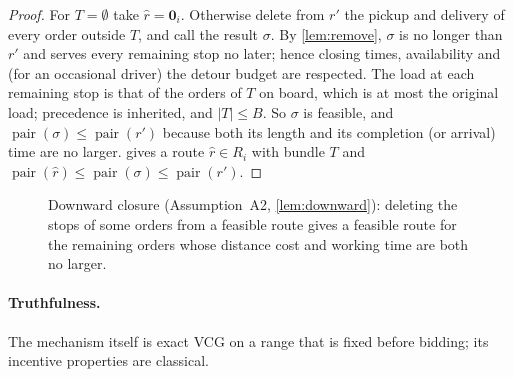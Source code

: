 \documentclass[11pt]{article}
\theoremstyle{definition}
\theoremstyle{remark}
\newcommand{\idle}{\mathbf{0}}
\newcommand{\pair}{\operatorname{pair}}
\begin{document}
\begin{proof}
For $T=\emptyset$ take $\hat r=\idle_i$. Otherwise delete from $r'$ the pickup
and delivery of every order outside $T$, and call the result $\sigma$. By
\cref{lem:remove}, $\sigma$ is no longer than $r'$ and serves every remaining
stop no later; hence closing times, availability and (for an occasional driver)
the detour budget are respected. The load at each remaining stop is that of the
orders of $T$ on board, which is at most the original load; precedence is
inherited, and $|T|\le B$. So $\sigma$ is feasible, and $\pair(\sigma)\le\pair(r')$
because both its length and its completion (or arrival) time are no larger.
 gives a route $\hat r\in R_i$ with bundle
$T$ and $\pair(\hat r)\le\pair(\sigma)\le\pair(r')$.
\end{proof}

\begin{figure}[!htbp]
\centering
{}
\caption{Downward closure (Assumption~A2, \cref{lem:downward}): deleting the
stops of some orders from a feasible route gives a feasible route for the
remaining orders whose distance cost and working time are both no larger.}
\label{fig:downward}
\end{figure}

\paragraph{Truthfulness.}
The mechanism itself is exact VCG on a range that is fixed before bidding; its
incentive properties are classical.
\end{document}
